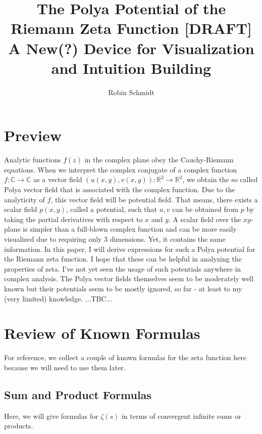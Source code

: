 \documentclass[12pt]{article}
\begin{document}
\parindent=0in
\parskip=0pt

 \setcounter{page}{1}

\title{The Polya Potential of the Riemann Zeta Function [DRAFT]\\ {\Large A New(?) Device for Visualization and Intuition Building}}
\author{Robin Schmidt}
\maketitle

\section{Preview}
Analytic functions $f(z)$ in the complex plane obey the Cauchy-Riemann equations. When we interpret the complex conjugate of a complex function $f: \mathbb{C} \rightarrow \mathbb{C}$ as a vector field $(u(x,y), v(x,y)): \mathbb{R}^2 \rightarrow \mathbb{R}^2$, we obtain the so called Polya vector field that is associated with the complex function. Due to the analyticity of $f$, this vector field will be potential field. That means, there exists a scalar field $p(x,y)$, called a potential, such that $u,v$ can be obtained from $p$ by taking the partial derivatives with respect to $x$ and $y$. A scalar field over the $xy$-plane is simpler than a full-blown complex function and can be more easily visualized due to requiring only 3 dimensions. Yet, it contains the same information. In this paper, I will derive expressions for such a Polya potential for the Riemann zeta function. I hope that these can be helpful in analyzing the properties of zeta. I've not yet seen the usage of such potentials anywhere in complex analysis. The Polya vector fields themselves seem to be moderately well known but their potentials seem to be mostly ignored, so far - at least to my (very limited) knowledge.  ...TBC...

\section{Review of Known Formulas}
For reference, we collect a couple of known formulas for the zeta function here because we will need to use them later.

\subsection{Sum and Product Formulas}
Here, we will give formulas for $\zeta(s)$ in terms of convergent infinite sums or products.
\end{document}
